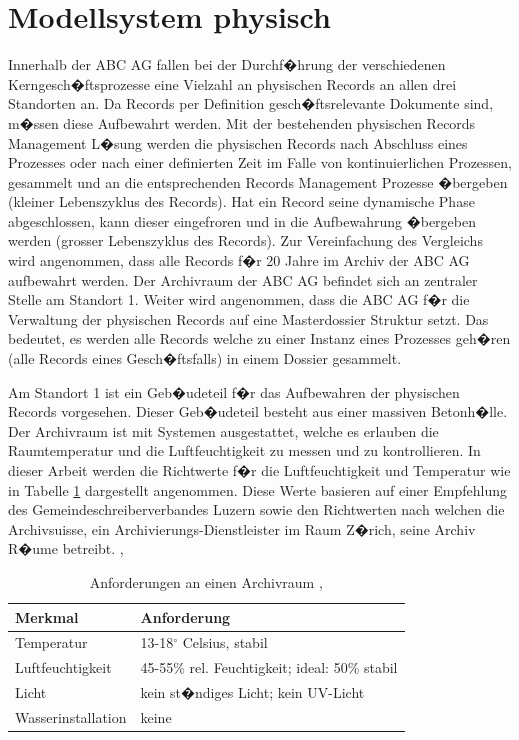 \documentclass[a4paper,twoside,10pt]{report}
\begin{document}
\section{Modellsystem physisch}\label{sec:modell_physisch}
Innerhalb der ABC AG fallen bei der Durchf�hrung der verschiedenen Kerngesch�ftsprozesse eine Vielzahl an physischen Records an allen drei Standorten an. Da Records per Definition gesch�ftsrelevante Dokumente sind, m�ssen diese Aufbewahrt werden. Mit der bestehenden physischen Records Management L�sung werden die physischen Records nach Abschluss eines Prozesses oder nach einer definierten Zeit im Falle von kontinuierlichen Prozessen, gesammelt und an die entsprechenden Records Management Prozesse �bergeben (kleiner Lebenszyklus des Records). Hat ein Record seine dynamische Phase abgeschlossen, kann dieser eingefroren und in die Aufbewahrung �bergeben werden (grosser Lebenszyklus des Records). Zur Vereinfachung des Vergleichs wird angenommen, dass alle Records f�r 20 Jahre im Archiv der ABC AG aufbewahrt werden. Der Archivraum der ABC AG befindet sich an zentraler Stelle am Standort 1. Weiter wird angenommen, dass die ABC AG f�r die Verwaltung der physischen Records auf eine Masterdossier Struktur setzt. Das bedeutet, es werden alle Records welche zu einer Instanz eines Prozesses geh�ren (alle Records eines Gesch�ftsfalls) in einem Dossier gesammelt. \cite{rmHandbook}

Am Standort 1 ist ein Geb�udeteil f�r das Aufbewahren der physischen Records vorgesehen. Dieser Geb�udeteil besteht aus einer massiven Betonh�lle. Der Archivraum ist mit Systemen ausgestattet, welche es erlauben die Raumtemperatur und die Luftfeuchtigkeit zu messen und zu kontrollieren. In dieser Arbeit werden die Richtwerte f�r die Luftfeuchtigkeit und Temperatur wie in Tabelle \ref{tab:archvraum} dargestellt angenommen. Diese Werte basieren auf einer Empfehlung des Gemeindeschreiberverbandes Luzern sowie den Richtwerten nach welchen die Archivsuisse, ein Archivierungs-Dienstleister im Raum Z�rich, seine Archiv R�ume betreibt. \cite{luzarchv}, \cite{archivesuisse}

\begin{table} [htb]
	\begin{tabular}{l|l}
	\hline
	\textbf{Merkmal} & \textbf{Anforderung} \\
	\hline
	Temperatur & 13-18$^{\circ}$ Celsius, stabil \\
	Luftfeuchtigkeit & 45-55\% rel. Feuchtigkeit; ideal: 50\% stabil \\
	Licht & kein st�ndiges Licht; kein UV-Licht \\
	Wasserinstallation & keine \\
	\hline
	\end{tabular}
\caption{Anforderungen an einen Archivraum \cite{luzarchv}, \cite{archivesuisse}} 
\label{tab:archvraum}
\end{table}
\end{document}
